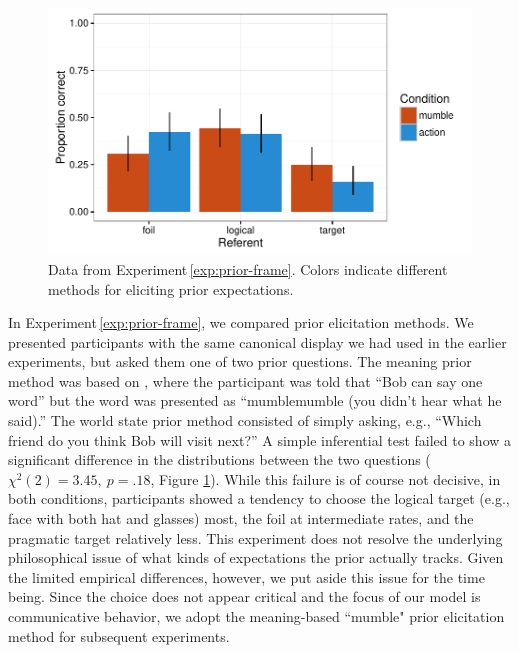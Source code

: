 \documentclass[man,noapacite]{apa2}
\newcounter{Experiment}
\newcommand{\exptref}[1]{Experiment\,\ref{#1}}
\begin{document}
\begin{figure}[t]
  \centering
  \includegraphics[width=5in]{../plots/2-prior-frame.pdf}
  \caption{\label{fig:prior-frame} Data from \exptref{exp:prior-frame}. Colors indicate different methods for eliciting prior expectations.}
\end{figure}

In \exptref{exp:prior-frame}, we compared prior elicitation methods. We presented participants with the same canonical display we had used in the earlier experiments, but asked them one of two prior questions. The meaning prior method was based on , where the participant was told that ``Bob can say one word'' but the word was presented as ``mumblemumble (you didn't hear what he said).'' The world state prior method consisted of simply asking, e.g., ``Which friend do you think Bob will visit next?'' A simple inferential test failed to show a significant difference in the distributions between the two questions ($\chi^2(2) = 3.45,~p = .18$, Figure \ref{fig:prior-frame}). While this failure is of course not decisive, in both conditions, participants showed a tendency to choose the logical target (e.g., face with both hat and glasses) most, the foil at intermediate rates, and the pragmatic target relatively less. This experiment does not resolve the underlying philosophical issue of what kinds of expectations the prior actually tracks. Given the limited empirical differences, however, we put aside this issue for the time being. Since the choice does not appear critical and the focus of our model is communicative behavior, we  adopt the meaning-based ``mumble" prior elicitation method for subsequent experiments.
\end{document}
